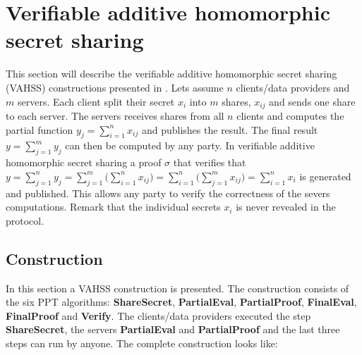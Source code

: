 \section{Verifiable additive homomorphic secret sharing}
\label{sec:VAHSS}
This section will describe the verifiable additive homomorphic secret sharing (VAHSS) constructions presented in \cite{VAHSS,SumItUp}. Lets assume  $n$ clients/data providers and $m$ servers. Each client split their secret $x_i$ into $m$ shares, $x_{ij}$ and sends one share to each server. The servers receives shares from all $n$ clients and computes the partial function $y_j = \sum_{i=1}^n x_{ij} $ and publishes the result. The final result $y = \sum_{j=1}^m y_j$ can then be computed by any party. In verifiable additive homomorphic secret sharing a proof $\sigma$ that verifies that $y= \sum_{j=1}^n y_j= \sum_{j=1}^m \big( \sum_{i=1}^n  x_{ij} \big) =  \sum_{i=1}^n \big( \sum_{j=1}^m  x_{ij} \big)  = \sum_{i=1}^n x_i$ is generated and published. This allows any party to verify the correctness of the severs computations. Remark that the individual secrets $x_i$ is never revealed in the protocol.


\subsection*{Construction}
In this section a VAHSS construction  is presented. The construction consists of the six PPT algorithms: \textbf{ShareSecret}, \textbf{PartialEval}, \textbf{PartialProof}, \textbf{FinalEval}, \textbf{FinalProof} and \textbf{Verify}. The clients/data providers executed the step \textbf{ShareSecret}, the servers \textbf{PartialEval} and \textbf{PartialProof} and the last three steps can run by anyone. The complete construction looks like:

